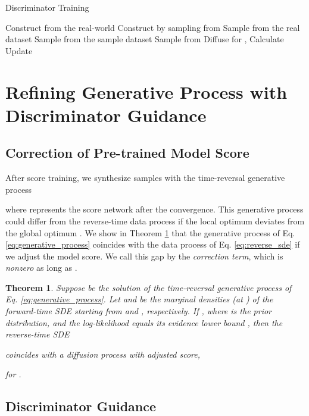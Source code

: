 \documentclass{article}
\theoremstyle{plain}
\newtheorem{theorem}{Theorem}\newtheorem{proposition}{Proposition}
\theoremstyle{definition}
\theoremstyle{remark}
\begin{document}
\begin{algorithm}[t]
	\centering
	\caption{Discriminator Training}\label{alg:discriminator}
	\begin{algorithmic}[1]
		\STATE Construct  from the real-world
		\STATE Construct  by sampling from 
		\STATE Sample  from the real dataset 
		\STATE Sample  from the sample dataset 
		\STATE Sample  from 
		\STATE Diffuse  for , 
		\STATE Calculate 
		\STATE Update 
		\ENDWHILE
	\end{algorithmic}
\end{algorithm}

\section{Refining Generative Process with Discriminator Guidance}\label{sec:methodology}

\subsection{Correction of Pre-trained Model Score}\label{sec:error}

After score training, we synthesize samples with the time-reversal generative process

where  represents the score network after the convergence. This generative process could differ from the reverse-time data process if the local optimum  deviates from the global optimum . We show in Theorem \ref{thm:1} that the generative process of Eq. \eqref{eq:generative_process} coincides with the data process of Eq. \eqref{eq:reverse_sde} if we adjust the model score. We call this gap by the \textit{correction term}, which is \textit{nonzero} as long as .
\begin{theorem}\label{thm:1}
	Suppose  be the solution of the time-reversal generative process of Eq. \eqref{eq:generative_process}. Let  and  be the marginal densities (at ) of the forward-time SDE  starting from  and , respectively. If , where  is the prior distribution, and the log-likelihood  equals its evidence lower bound , then the reverse-time SDE
	
	coincides with a diffusion process with adjusted score,
	
	for .
\end{theorem}

\subsection{Discriminator Guidance}\label{sec:adjusted_generative_process}
\end{document}
